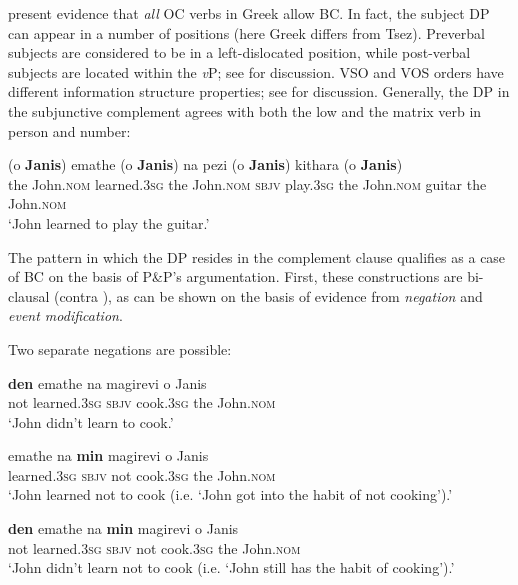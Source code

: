 \documentclass[output=paper]{langsci/langscibook}
\begin{document}
\citet{Alexiadou2010} present evidence that \emph{all} OC verbs in Greek allow BC. In fact, the subject DP can appear in a number of positions (here Greek differs from Tsez). Preverbal subjects are considered to be in a left-dislocated position, while post-verbal subjects are located within the \textit{v}P; see \citet{Alexiadou1998} for discussion. VSO and VOS orders have different information structure properties; see \citet{Alexiadou1999,Alexiadou2000} for discussion.  Generally, the DP in the subjunctive complement agrees with both the low and the matrix verb in person and number:



\ea%
    \label{ex:alexiadou:6}
    \gll (o \textbf{Janis}) emathe (o \textbf{Janis}) na pezi  (o \textbf{Janis}) kithara (o \textbf{Janis})\\
         the John.\textsc{nom} learned.\textsc{3sg} the John.\textsc{nom} \textsc{sbjv} play.\textsc{3sg} the John.\textsc{nom} guitar the John.\textsc{nom}\\
    \glt    ‘John learned to play the guitar.’
    \z

The pattern in which the DP resides in the complement clause qualifies as a case of BC on the basis of P\&P’s argumentation. First, these constructions are bi-clausal (contra \citealt{Roussou2009}), as can be shown on the basis of evidence from \textit{negation} and \textit{event modification}.

Two separate negations are possible:

\ea%
    \label{ex:alexiadou:7}
\ea
\gll    \textbf{den}  emathe    na    magirevi   o    Janis\\
    not   learned.\textsc{3sg}  \textsc{sbjv}  cook.\textsc{3sg}    the    John.\textsc{nom}\\
\glt    ‘John didn’t learn to cook.’

\ex
\gll    emathe     na   \textbf{min}   magirevi    o    Janis\\
    learned.\textsc{3sg}  \textsc{sbjv} not  cook.\textsc{3sg} the   John.\textsc{nom}\\
\glt ‘John learned not to cook (i.e. ‘John got into the habit of not cooking’).’

\ex
\gll    \textbf{den}   emathe    na   \textbf{min} magirevi    o    Janis\\
    not  learned.\textsc{3sg}  \textsc{sbjv} not  cook.\textsc{3sg}    the   John.\textsc{nom}\\
\glt    ‘John didn’t learn not to cook (i.e. ‘John still has the habit of cooking’).’
\z
\z
\end{document}
